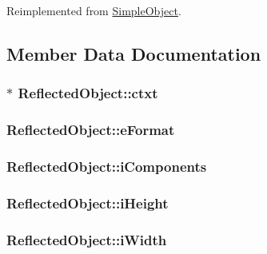 Reimplemented from \hyperlink{class_simple_object_a5fe4d692b6633f2c68b6eae1d3f6b059}{Simple\-Object}.



\subsection{Member Data Documentation}
\hypertarget{class_reflected_object_a738e99a76838e45c4b953b25eab0d36a}{
\subsubsection[{ctxt}]{$\ast$ Reflected\-Object\-::ctxt}}\label{class_reflected_object_a738e99a76838e45c4b953b25eab0d36a}
\hypertarget{class_reflected_object_abbcd1c6196c972ac7656eda5b96b6b7b}{
\subsubsection[{e\-Format}]{ Reflected\-Object\-::e\-Format}}\label{class_reflected_object_abbcd1c6196c972ac7656eda5b96b6b7b}
\hypertarget{class_reflected_object_a0e73769d17244d41cbc7be2e9ba28cb6}{
\subsubsection[{i\-Components}]{ Reflected\-Object\-::i\-Components}}\label{class_reflected_object_a0e73769d17244d41cbc7be2e9ba28cb6}
\hypertarget{class_reflected_object_ad9b1acb9aec983faba0ada8c26bf8f63}{
\subsubsection[{i\-Height}]{ Reflected\-Object\-::i\-Height}}\label{class_reflected_object_ad9b1acb9aec983faba0ada8c26bf8f63}
\hypertarget{class_reflected_object_a583a67a5b6dbda1287e2b37de5ea71ed}{
\subsubsection[{i\-Width}]{ Reflected\-Object\-::i\-Width}}\label{class_reflected_object_a583a67a5b6dbda1287e2b37de5ea71ed}
